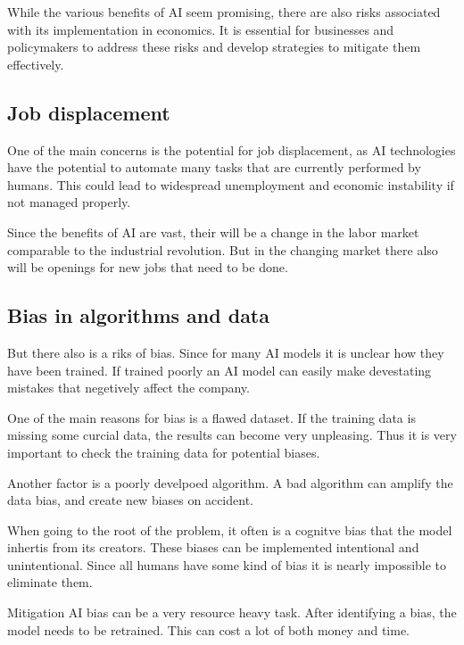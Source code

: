 While the various benefits of AI seem promising, there are also risks associated with its implementation in economics.
It is essential for businesses and policymakers to address these risks and develop strategies to mitigate them effectively.

\cite{AiEconomics}

\subsection{Job displacement}
\label{subsec:job-displacement}

One of the main concerns is the potential for job displacement, as AI technologies have the potential to automate many tasks that are currently performed by humans. This could lead to widespread unemployment and economic instability if not managed properly. 

Since the benefits of AI are vast, their will be a change in the labor market comparable to the industrial revolution.  
But in the changing market there also will be openings for new jobs that need to be done. 

\cite{AiAndJobs} 

\subsection{Bias in algorithms and data}
\label{subsec:bias-in-algorithms-and-data}

But there also is a riks of bias. Since for many AI models it is unclear how they have been trained. 
If trained poorly an AI model can easily make devestating mistakes that negetively affect the company.

One of the main reasons for bias is a flawed dataset. If the training data is missing some curcial data, the results can become very unpleasing. 
Thus it is very important to check the training data for potential biases.

Another factor is a poorly develpoed algorithm. A bad algorithm can amplify the data bias, and create new biases on accident. 

When going to the root of the problem, it often is a cognitve bias that the model inhertis from its creators. 
These biases can be implemented intentional and unintentional. Since all humans have some kind of bias it is nearly impossible to eliminate them. 

Mitigation AI bias can be a very resource heavy task. After identifying a bias, the model needs to be retrained. This can cost a lot of both money and time. 

